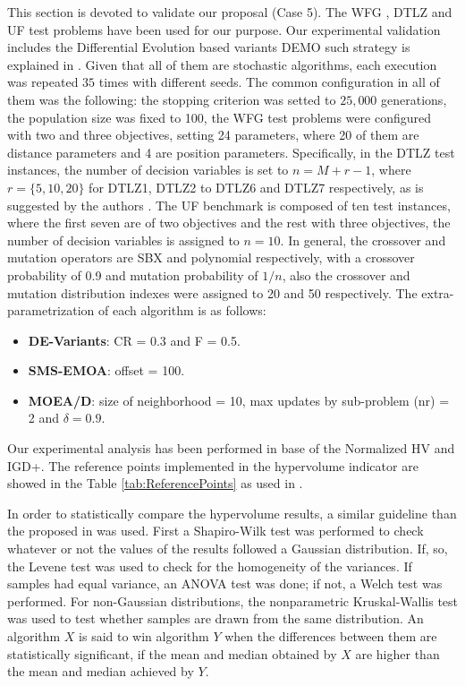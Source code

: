 This section is devoted to validate our proposal (Case 5).
%
The WFG \cite{Joel:WFG}, DTLZ \cite{Joel:DTLZ_2} and UF \cite{zhang2009performance} test problems have been used for our purpose.
%
Our experimental validation includes the Differential Evolution based variants DEMO such strategy is explained in \cite{tuvsar2007differential}.
%
Given that all of them are stochastic algorithms, each execution was repeated $35$ times with different seeds.
%
The common configuration in all of them was the following: the stopping criterion was setted to $25,000$ generations, the population size was fixed to 100, the WFG test problems were configured with two and three objectives, setting 24 parameters, where 20 of them are distance parameters and 4 are position parameters.
%
Specifically, in the DTLZ test instances, the number of decision variables is set to $n=M+r-1$, where $r=\{5, 10, 20\}$ for DTLZ1, DTLZ2 to DTLZ6 and DTLZ7 respectively, as is suggested by the authors \cite{Joel:DTLZ_2}.  
% 
The UF benchmark is composed of ten test instances, where the first seven are of two objectives and the rest with three objectives, the number of decision variables is assigned to $n=10$.
%
In general, the crossover and mutation operators are SBX and polynomial respectively, with a crossover probability of 0.9 and mutation probability of $1/n$, also the crossover and mutation distribution indexes were assigned to 20 and 50 respectively.
%
The extra-parametrization of each algorithm is as follows:
\begin{itemize}
\item \textbf{DE-Variants}: CR = 0.3 and F = 0.5.
\item \textbf{SMS-EMOA}: offset = 100.
\item \textbf{MOEA/D}: size of neighborhood = 10, max updates by sub-problem (nr) = 2 and $\delta = 0.9$.
\end{itemize}
%
Our experimental analysis has been performed in base of the Normalized HV and IGD+.
%
The reference points implemented in the hypervolume indicator are showed in the Table \ref{tab:ReferencePoints} as used in \cite{Joel:Kuhn_Munkres, Joel:OperatorAHX}.


In order to statistically compare the hypervolume results, a similar guideline than the proposed in \cite{Joel:StatisticalTest} was used. 
%
First a Shapiro-Wilk test was performed to check whatever or not the values of the results followed a Gaussian distribution. 
%
If, so, the Levene test was used to check for the homogeneity of the variances. 
%
If samples had equal variance, an ANOVA test was done; if not, a Welch test was performed. 
%
For non-Gaussian distributions, the nonparametric Kruskal-Wallis test was used to test whether samples are drawn from the same distribution. 
%
An algorithm $X$ is said to win algorithm $Y$ when the differences between them are statistically significant, if the mean and median obtained by $X$ are higher than the mean and median achieved by $Y$.
%

